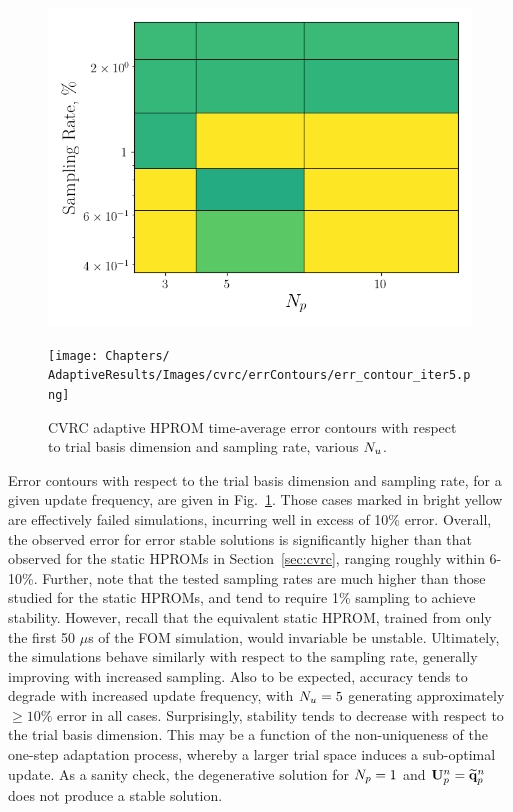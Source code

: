 \begin{figure}
	\begin{minipage}{0.46\linewidth}
		\includegraphics[width=0.99\linewidth]{Chapters/AdaptiveResults/Images/cvrc/errContours/err_contour_iter4.png}
	\end{minipage}
	\begin{minipage}{0.53\linewidth}
		\texttt{[image: Chapters/	AdaptiveResults/Images/cvrc/errContours/err\_contour\_iter5.png]}
	\end{minipage}
	\caption{\label{fig:cvrcAdaptiveROMErrContour}CVRC adaptive HPROM time-average error contours with respect to trial basis dimension and sampling rate, various $N_u$.}
\end{figure}

Error contours with respect to the trial basis dimension and sampling rate, for a given update frequency, are given in Fig.~\ref{fig:cvrcAdaptiveROMErrContour}. Those cases marked in bright yellow are effectively failed simulations, incurring well in excess of 10\% error. Overall, the observed error for error stable solutions is significantly higher than that observed for the static HPROMs in Section~\ref{sec:cvrc}, ranging roughly within 6-10\%. Further, note that the tested sampling rates are much higher than those studied for the static HPROMs, and tend to require 1\% sampling to achieve stability. However, recall that the equivalent static HPROM, trained from only the first 50 $\mu$s of the FOM simulation, would invariable be unstable. Ultimately, the simulations behave similarly with respect to the sampling rate, generally improving with increased sampling. Also to be expected, accuracy tends to degrade with increased update frequency, with $N_u = 5$ generating approximately $\ge 10\%$ error in all cases. Surprisingly, stability tends to decrease with respect to the trial basis dimension. This may be a function of the non-uniqueness of the one-step adaptation process, whereby a larger trial space induces a sub-optimal update. As a sanity check, the degenerative solution for $N_p = 1$ and $\primTrial^{\timeIdx} = \primVecRom^{\timeIdx}$ does not produce a stable solution.

